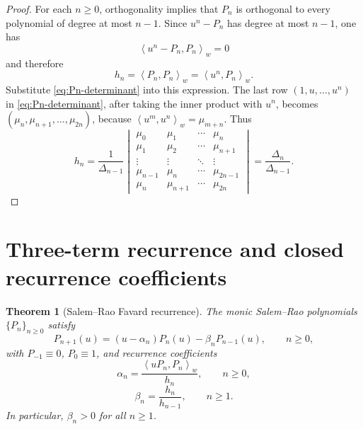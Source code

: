 \documentclass[11pt]{amsart}
\numberwithin{equation}{section}
\newtheorem{theorem}{Theorem}[section]
\theoremstyle{definition}
\newcommand{\mom}[1]{\mu_{#1}}
\newcommand{\DeltaH}[1]{\Delta_{#1}}
\newcommand{\inner}[2]{\left\langle #1,#2\right\rangle_{w}}
\begin{document}
\begin{proof}
For each $n\ge 0$, orthogonality implies that $P_{n}$ is orthogonal to every
polynomial of degree at most $n-1$. Since $u^{n}-P_{n}$ has degree at most
$n-1$, one has
\[
\inner{u^{n}-P_{n}}{P_{n}}=0
\]
and therefore
\[
h_{n}=\inner{P_{n}}{P_{n}}
=\inner{u^{n}}{P_{n}}.
\]
Substitute \eqref{eq:Pn-determinant} into this expression. The last row
$(1,u,\dots,u^{n})$ in \eqref{eq:Pn-determinant}, after taking the inner
product with $u^{n}$, becomes $(\mom{n},\mom{n+1},\dots,\mom{2n})$, because
$\inner{u^{m}}{u^{n}}=\mom{m+n}$. Thus
\[
h_{n}
=\frac{1}{\DeltaH{n-1}}
\begin{vmatrix}
\mom{0} & \mom{1} & \cdots & \mom{n}\\
\mom{1} & \mom{2} & \cdots & \mom{n+1}\\
\vdots  & \vdots  & \ddots & \vdots\\
\mom{n-1} & \mom{n} & \cdots & \mom{2n-1}\\
\mom{n} & \mom{n+1} & \cdots & \mom{2n}
\end{vmatrix}
=\frac{\DeltaH{n}}{\DeltaH{n-1}}.
\]
\end{proof}

\section{Three-term recurrence and closed recurrence coefficients}

\begin{theorem}[Salem--Rao Favard recurrence]\label{thm:recurrence}
The monic Salem--Rao polynomials $\{P_{n}\}_{n\ge 0}$ satisfy
\begin{equation}\label{eq:recurrence}
P_{n+1}(u)=(u-\alpha_{n})P_{n}(u)-\beta_{n}P_{n-1}(u),
\qquad n\ge 0,
\end{equation}
with $P_{-1}\equiv 0$, $P_{0}\equiv 1$, and recurrence coefficients
\begin{equation}\label{eq:alpha-general}
\alpha_{n}=\frac{\inner{uP_{n}}{P_{n}}}{h_{n}},\qquad n\ge 0,
\end{equation}
\begin{equation}\label{eq:beta-general}
\beta_{n}=\frac{h_{n}}{h_{n-1}},\qquad n\ge 1.
\end{equation}
In particular, $\beta_{n}>0$ for all $n\ge 1$.
\end{theorem}
\end{document}
